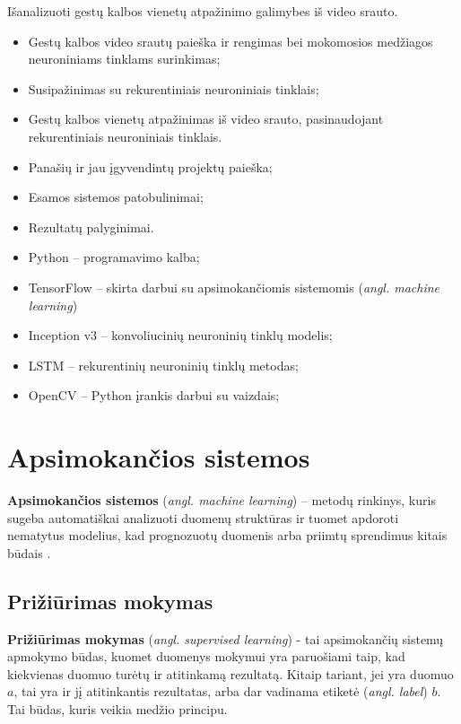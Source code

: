 \documentclass{VUMIFPSbakalaurinis}
\begin{document}
Išanalizuoti gestų kalbos vienetų atpažinimo galimybes iš video srauto.

\begin{itemize}
	\item Gestų kalbos video srautų paieška ir rengimas bei mokomosios medžiagos neuroniniams tinklams surinkimas;
	\item Susipažinimas su rekurentiniais neuroniniais tinklais;
	\item Gestų kalbos vienetų atpažinimas iš video srauto, pasinaudojant rekurentiniais neuroniniais tinklais.
\end{itemize}

\begin{itemize}
	\item Panašių ir jau įgyvendintų projektų paieška;
	\item Esamos sistemos patobulinimai;
	\item Rezultatų palyginimai.
\end{itemize}

\begin{itemize}
	\item Python – programavimo kalba;
	\item TensorFlow – skirta darbui su apsimokančiomis sistemomis (\textit{angl. machine learning})
	\item Inception v3 – konvoliucinių neuroninių tinklų modelis;
	\item LSTM – rekurentinių neuroninių tinklų metodas;
	\item OpenCV – Python įrankis darbui su vaizdais;
\end{itemize}


\section{Apsimokančios sistemos}
\textbf{Apsimokančios sistemos} (\textit{angl. machine learning}) – metodų rinkinys, kuris sugeba automatiškai analizuoti duomenų struktūras ir tuomet apdoroti nematytus modelius, kad prognozuotų duomenis arba priimtų sprendimus kitais būdais \cite{doi:10.1080/09332480.2014.914768}.

\subsection{Prižiūrimas mokymas}
\textbf{Prižiūrimas mokymas} (\textit{angl. supervised learning}) - tai apsimokančių sistemų apmokymo būdas, kuomet duomenys mokymui yra paruošiami taip, kad kiekvienas duomuo turėtų ir atitinkamą rezultatą. Kitaip tariant, jei yra duomuo $a$, tai yra ir jį atitinkantis rezultatas, arba dar vadinama etiketė (\textit{angl. label}) $b$. Tai būdas, kuris veikia medžio principu.
\end{document}
